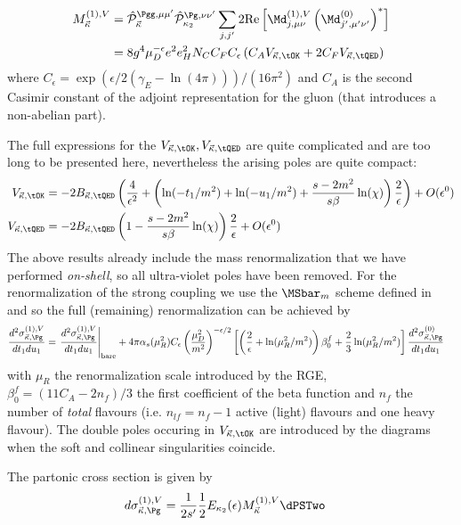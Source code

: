 \begin{align}
M_{\vec \kappa}^{(1),V}&=\hat {\mathcal P}_{\vec \kappa}^{\Pgg,\mu\mu'}\hat {\mathcal P}_{\kappa_2}^{\Pg,\nu\nu'}\sum_{j,j'}2\text{Re}\left[\Md^{(1),V}_{j,\mu\nu}\left(\Md^{(0)}_{j',\mu'\nu'}\right)^*\right] \nonumber\\
 &= 8g^4\mu_D^{-\epsilon}e^2e_H^2 N_C C_FC_\epsilon\left( C_A V_{\vec \kappa,\tOK} + 2C_F V_{\vec \kappa,\tQED}\right)
\end{align}
where $C_\epsilon = \exp(\epsilon/2(\gamma_E-\ln(4\pi)))/(16\pi^2)$ and $C_A$ is the second Casimir constant of the adjoint representation for the gluon (that introduces a non-abelian part).

The full expressions for the $V_{\vec \kappa,\tOK},V_{\vec \kappa,\tQED}$ are quite complicated and are too long to be presented here, nevertheless the arising poles are quite compact:
\begin{align}
V_{\vec \kappa,\tOK} &= -2B_{\vec \kappa,\tQED}\left(\frac 4 {\epsilon^2} + \left(\ln(-t_1/m^2) + \ln(-u_1/m^2) +\frac{s-2m^2}{s\beta}\ln(\chi)\right)\frac 2 \epsilon \right) + O(\epsilon^0)\\
V_{\vec \kappa,\tQED} &= -2B_{\vec \kappa,\tQED}\left(1-\frac{s-2m^2}{s\beta}\ln(\chi)\right)\frac 2 \epsilon + O(\epsilon^0)
\end{align}
The above results already include the mass renormalization that we have performed \textit{on-shell}, so all ultra-violet poles have been removed. For the renormalization of the strong coupling we use the $\MSbar_m$ scheme defined in \cite{Bojak:2000eu} and so the full (remaining) renormalization can be achieved by
\begin{align}
\frac{d^2\sigma_{\vec \kappa,\Pg}^{(1),V}}{dt_1du_1} &=\left.\frac{d^2\sigma_{\vec \kappa,\Pg}^{(1),V}}{dt_1du_1} \right|_{\text{bare}}+ 4\pi\alpha_s(\mu_R^2)C_\epsilon\left(\frac{\mu_D^2}{m^2}\right)^{-\epsilon/2}\left[\left(\frac 2 \epsilon +\ln(\mu_R^2/m^2)\right)\beta_0^f +\frac 2 3 \ln(\mu_R^2/m^2)\right]\frac{d^2\sigma_{\vec \kappa,\Pg}^{(0)}}{dt_1du_1}
\end{align}
with $\mu_R$ the renormalization scale introduced by the RGE, $\beta_0^f = (11C_A- 2n_{f})/3$ the first coefficient of the beta function and $n_f$ the number of \textit{total} flavours (i.e. $n_{lf}=n_f-1$ active (light) flavours and one heavy flavour). The double poles occuring in $V_{\vec \kappa,\tOK}$ are introduced by the diagrams  when the soft and collinear singularities coincide.

The partonic cross section is given by
\begin{align}
d\sigma_{\vec \kappa,\Pg}^{(1),V} &= \frac 1 {2s'}\frac 1 2 E_{\kappa_2}(\epsilon) M_{\vec \kappa}^{(1),V} \dPSTwo
\end{align}
